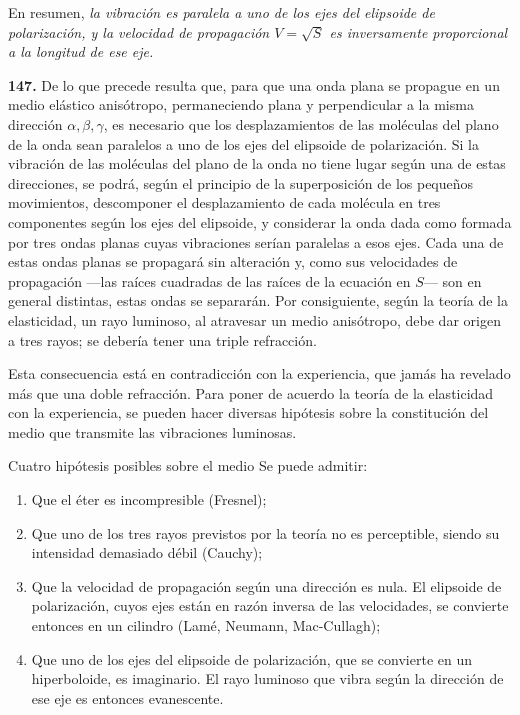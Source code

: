 En resumen, \emph{la vibración es paralela a uno de los ejes del elipsoide
de polarización, y la velocidad de propagación $V=\sqrt{S}$ es
inversamente proporcional a la longitud de ese eje.}

\noindent\textbf{147.} De lo que precede resulta que, para que una onda
plana se propague en un medio elástico anisótropo, permaneciendo plana y
perpendicular a la misma dirección $\alpha,\beta,\gamma$, es necesario que
los desplazamientos de las moléculas del plano de la onda sean paralelos a
uno de los ejes del elipsoide de polarización. Si la vibración de las
moléculas del plano de la onda no tiene lugar según una de estas
direcciones, se podrá, según el principio de la superposición de los
pequeños movimientos, descomponer el desplazamiento de cada molécula en
tres componentes según los ejes del elipsoide, y considerar la onda dada
como formada por tres ondas planas cuyas vibraciones serían paralelas a
esos ejes. Cada una de estas ondas planas se propagará sin alteración y,
como sus velocidades de propagación —las raíces cuadradas de las raíces de
la ecuación en $S$— son en general distintas, estas ondas se separarán.
Por consiguiente, según la teoría de la elasticidad, un rayo luminoso, al
atravesar un medio anisótropo, debe dar origen a tres rayos; se debería
tener una triple refracción.

Esta consecuencia está en contradicción con la experiencia, que jamás ha
revelado más que una doble refracción. Para poner de acuerdo la teoría de
la elasticidad con la experiencia, se pueden hacer diversas hipótesis
sobre la constitución del medio que transmite las vibraciones luminosas.

\begin{enunciado}{Cuatro hipótesis posibles sobre el medio}
Se puede admitir:
\begin{enumerate}
\item[1.\textsuperscript{o}] Que el éter es incompresible (Fresnel);
\item[2.\textsuperscript{o}] Que uno de los tres rayos previstos por la teoría no es
perceptible, siendo su intensidad demasiado débil (Cauchy);
\item[3.\textsuperscript{o}] Que la velocidad de propagación según una dirección es
nula. El elipsoide de polarización, cuyos ejes están en razón inversa de
las velocidades, se convierte entonces en un cilindro (Lamé, Neumann,
Mac-Cullagh);
\item[4.\textsuperscript{o}] Que uno de los ejes del elipsoide de polarización, que se
convierte en un hiperboloide, es imaginario. El rayo luminoso que vibra
según la dirección de ese eje es entonces evanescente.
\end{enumerate}
\end{enunciado}

